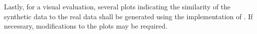 Lastly, for a visual evaluation, several plots indicating the similarity of the synthetic data to the real data shall be generated using the implementation of \cite{brenninkmeijer2019GenerationEvaluationTabular}.
If necessary, modifications to the plots may be required.


